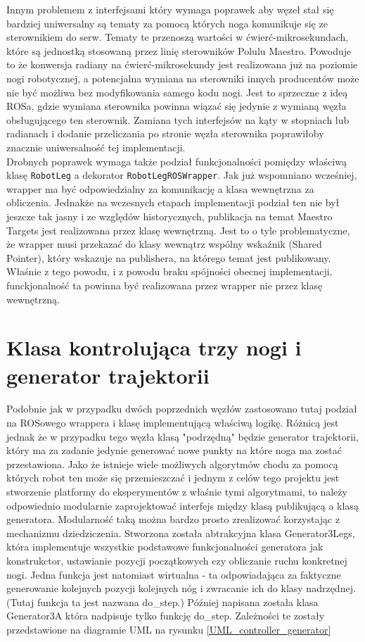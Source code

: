 Innym problemem z interfejsami który wymaga poprawek aby węzeł stał się bardziej uniwersalny są tematy za pomocą których noga komunikuje się ze sterownikiem do serw. Tematy te przenoszą wartości w ćwierć-mikrosekundach, które są jednostką stosowaną przez linię sterowników Polulu Maestro. Powoduje to że konwersja radiany na ćwierć-mikrosekundy jest realizowana już na poziomie nogi robotycznej, a potencjalna wymiana na sterowniki innych producentów może nie być możliwa bez modyfikowania samego kodu nogi. Jest to sprzeczne z ideą ROSa, gdzie wymiana sterownika powinna wiązać się jedynie z wymianą węzła obsługującego ten sterownik. Zamiana tych interfejsów na kąty w stopniach lub radianach i dodanie przeliczania po stronie węzła sterownika poprawiłoby znacznie uniwersalność tej implementacji.\\

Drobnych poprawek wymaga także podział funkcjonalności pomiędzy właściwą klasę \texttt{RobotLeg} a dekorator \texttt{RobotLegROSWrapper}. Jak już wspomniano wcześniej, wrapper ma być odpowiedzialny za komunikację a klasa wewnętrzna za obliczenia. Jednakże na wczesnych etapach implementacji podział ten nie był jeszcze tak jasny i ze względów historycznych, publikacja na temat Maestro Targets jest realizowana przez klasę wewnętrzną. Jest to o tyle problematyczne, że wrapper musi przekazać do klasy wewnątrz wspólny wskaźnik (Shared Pointer), który wskazuje na publishera, na którego temat jest publikowany. Właśnie z tego powodu, i z powodu braku spójności obecnej implementacji, funckjonalność ta powinna być realizowana przez wrapper nie przez klasę wewnętrzną.\\

\section{Klasa kontrolująca trzy nogi i generator trajektorii}
Podobnie jak w przypadku dwóch poprzednich węzłów zastosowano tutaj podział na ROSowego wrappera i klasę implementującą właściwą logikę. Różnicą jest jednak że w przypadku tego węzła klasą "podrzędną" będzie generator trajektorii, który ma za zadanie jedynie generować nowe punkty na które noga ma zostać przestawiona. Jako że istnieje wiele możliwych algorytmów chodu za pomocą których robot ten może się przemieszczać i jednym z celów tego projektu jest stworzenie platformy do eksperymentów z właśnie tymi algorytmami, to należy odpowiednio modularnie zaprojektować interfejs między klasą publikującą a klasą generatora. Modularność taką można bardzo prosto zrealizować korzystając z mechanizmu dziedziczenia. Stworzona została abtrakcyjna klasa Generator3Legs, która implementuje wszystkie podstawowe funkcjonalności generatora jak konstrukctor, ustawianie pozycji początkowych czy obliczanie ruchu konkretnej nogi. Jedna funkcja jest natomiast wirtualna - ta odpowiadająca za faktyczne generowanie kolejnych pozycji kolejnych nóg i zwracanie ich do klasy nadrzędnej. (Tutaj funkcja ta jest nazwana do\_step.) Później napisana została klasa Generator3A która nadpisuje tylko funkcję do\_step. Zależności te zostały przedstawione na diagramie UML na rysunku \ref{UML_controller_generator}\\

